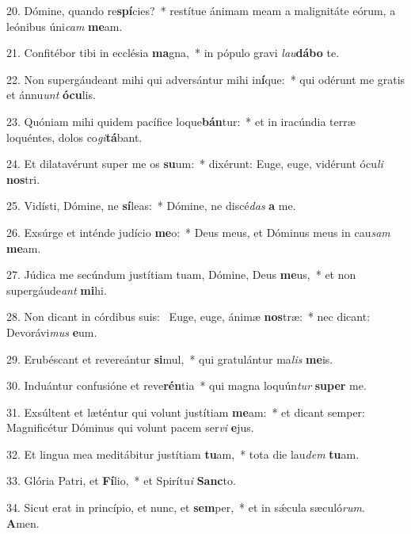 20. Dómine, quando re\textbf{spí}cies?~*  restítue ánimam meam a malignitáte eórum, a leónibus úni\textit{cam} \textbf{me}am.\

21. Confitébor tibi in ecclésia \textbf{ma}gna,~*  in pópulo gravi \textit{lau}\textbf{dá}\textbf{bo} te.\

22. Non supergáudeant mihi qui adversántur mihi in\textbf{í}que:~*  qui odérunt me gratis et ánnu\textit{unt} \textbf{ó}\textbf{cu}lis.\

23. Quóniam mihi quidem pacífice loque\textbf{bán}tur:~*  et in iracúndia terræ loquéntes, dolos co\textit{gi}\textbf{tá}bant.\

24. Et dilatavérunt super me os \textbf{su}um:~*  dixérunt: Euge, euge, vidérunt ócu\textit{li} \textbf{nos}tri.\

25. Vidísti, Dómine, ne \textbf{sí}leas:~*  Dómine, ne discé\textit{das} \textbf{a} me.\

26. Exsúrge et inténde judício \textbf{me}o:~*  Deus meus, et Dóminus meus in cau\textit{sam} \textbf{me}am.\

27. Júdica me secúndum justítiam tuam, Dómine, Deus \textbf{me}us,~*  et non supergáude\textit{ant} \textbf{mi}hi.\

28. Non dicant in córdibus suis: \dag\  Euge, euge, ánimæ \textbf{nos}træ:~*  nec dicant: Devorávi\textit{mus} \textbf{e}um.\

29. Erubéscant et revereántur \textbf{si}mul,~*  qui gratulántur ma\textit{lis} \textbf{me}is.\

30. Induántur confusióne et reve\textbf{rén}tia~*  qui magna loquún\textit{tur} \textbf{su}\textbf{per} me.\

31. Exsúltent et læténtur qui volunt justítiam \textbf{me}am:~*  et dicant semper: Magnificétur Dóminus qui volunt pacem ser\textit{vi} \textbf{e}jus.\

32. Et lingua mea meditábitur justítiam \textbf{tu}am,~*  tota die lau\textit{dem} \textbf{tu}am.\

33. Glória Patri, et \textbf{Fí}lio,~*  et Spirítu\textit{i} \textbf{Sanc}to.\

34. Sicut erat in princípio, et nunc, et \textbf{sem}per,~*  et in sǽcula sæculó\textit{rum}. \textbf{A}men.\


